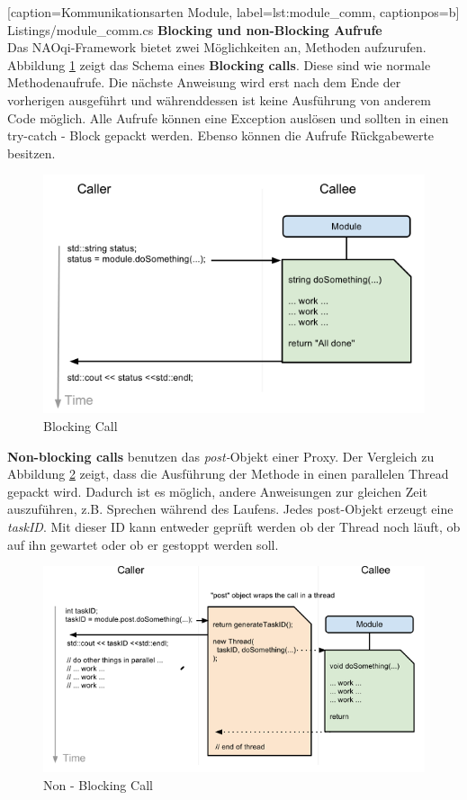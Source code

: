 
    [caption={Kommunikationsarten Module},
       label=lst:module_comm,
       captionpos=b]	
 {Listings/module_comm.cs}
\vspace{0.4cm}
\noindent	
\textbf{Blocking und non-Blocking Aufrufe}
\\
Das NAOqi-Framework bietet zwei Möglichkeiten an, Methoden aufzurufen. 
Abbildung \ref{f:naoqi_blockingcall} zeigt das Schema eines \textbf{Blocking calls}. Diese sind wie normale Methodenaufrufe. Die nächste Anweisung wird erst nach dem Ende der vorherigen ausgeführt und währenddessen ist keine Ausführung von anderem Code möglich. Alle Aufrufe können eine Exception auslösen und sollten in einen try-catch - Block gepackt werden. Ebenso können die Aufrufe Rückgabewerte besitzen.
\begin{figure}[H]						
	\centering							
	\includegraphics[scale=0.8]{Bilder/blockingcall.PNG}
	\caption{Blocking Call}						
	\label{f:naoqi_blockingcall}						
\end{figure}
\noindent
\textbf{Non-blocking calls} benutzen das \textit{post-}Objekt einer Proxy. Der Vergleich zu Abbildung \ref{f:naoqi_nonblockingcall} zeigt, dass die Ausführung der Methode in einen parallelen Thread gepackt wird. Dadurch ist es möglich, andere Anweisungen zur gleichen Zeit auszuführen, z.B. Sprechen während des Laufens. Jedes post-Objekt erzeugt eine \textit{taskID}. Mit dieser ID kann entweder geprüft werden ob der Thread noch läuft, ob auf ihn gewartet oder ob er gestoppt werden soll. 
\begin{figure}[H]						
	\centering							
	\includegraphics[scale=0.8]{Bilder/nonblockingcall.PNG}
	\caption{Non - Blocking Call}						
	\label{f:naoqi_nonblockingcall}						
\end{figure}


